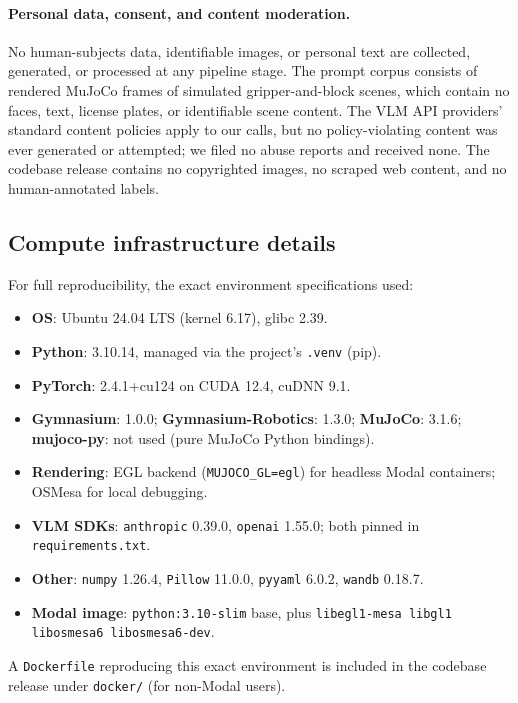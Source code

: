 \paragraph{Personal data, consent, and content moderation.}
No human-subjects data, identifiable images, or personal text are
collected, generated, or processed at any pipeline stage. The
prompt corpus consists of rendered MuJoCo frames of simulated
gripper-and-block scenes, which contain no faces, text, license
plates, or identifiable scene content. The VLM API providers'
standard content policies apply to our calls, but no policy-violating
content was ever generated or attempted; we filed no abuse reports
and received none. The codebase release contains no copyrighted
images, no scraped web content, and no human-annotated labels.

\subsection{Compute infrastructure details}
\label{app:infra}

For full reproducibility, the exact environment specifications used:
\begin{itemize}\itemsep0pt
\item \textbf{OS}: Ubuntu 24.04 LTS (kernel 6.17), glibc 2.39.
\item \textbf{Python}: 3.10.14, managed via the project's \texttt{.venv} (pip).
\item \textbf{PyTorch}: 2.4.1+cu124 on CUDA 12.4, cuDNN 9.1.
\item \textbf{Gymnasium}: 1.0.0; \textbf{Gymnasium-Robotics}: 1.3.0;
\textbf{MuJoCo}: 3.1.6; \textbf{mujoco-py}: not used (pure MuJoCo Python bindings).
\item \textbf{Rendering}: EGL backend (\texttt{MUJOCO\_GL=egl}) for
headless Modal containers; OSMesa for local debugging.
\item \textbf{VLM SDKs}: \texttt{anthropic} 0.39.0,
\texttt{openai} 1.55.0; both pinned in
\texttt{requirements.txt}.
\item \textbf{Other}: \texttt{numpy} 1.26.4, \texttt{Pillow} 11.0.0,
\texttt{pyyaml} 6.0.2, \texttt{wandb} 0.18.7.
\item \textbf{Modal image}: \texttt{python:3.10-slim} base, plus
\texttt{libegl1-mesa libgl1 libosmesa6 libosmesa6-dev}.
\end{itemize}

A \texttt{Dockerfile} reproducing this exact environment is included in
the codebase release under \texttt{docker/} (for non-Modal users).

